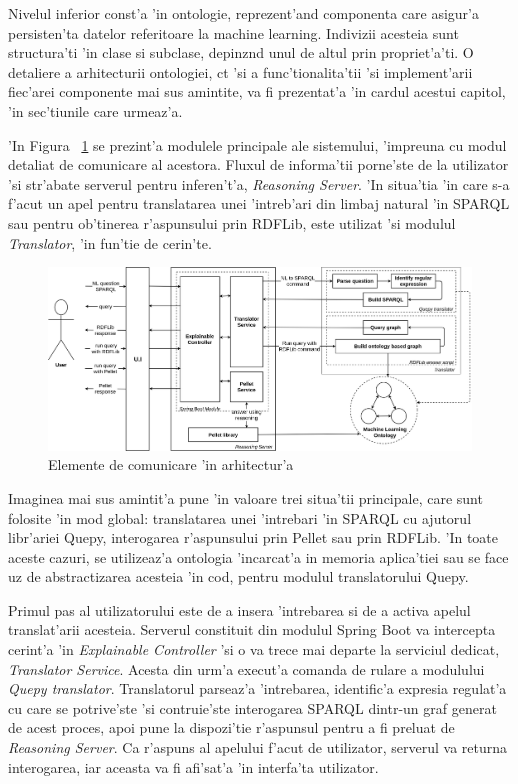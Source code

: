 \documentclass[12pt,a4paper,twoside]{report}
\begin{document}
Nivelul inferior const'a 'in ontologie, reprezent'and componenta care asigur'a persisten'ta datelor referitoare la machine learning. Indivizii acesteia sunt structura'ti 'in clase si subclase, depinz\ia nd unul de altul prin propriet'a'ti. O detaliere a arhitecturii ontologiei, c\ia t 'si a func'tionalita'tii 'si implement'arii fiec'arei componente mai sus amintite, va fi prezentat'a 'in cardul acestui capitol, 'in sec'tiunile care urmeaz'a. 

'In Figura ~\ref{fig:arch_det} se prezint'a modulele principale ale sistemului, 'impreuna cu modul detaliat de comunicare al acestora. Fluxul de informa'tii porne'ste de la utilizator 'si str'abate serverul pentru inferen't'a, {\it Reasoning Server}. 'In situa'tia 'in care s-a f'acut un apel pentru translatarea unei 'intreb'ari din limbaj natural 'in SPARQL sau pentru ob'tinerea r'aspunsului prin RDFLib, este utilizat 'si modulul {\it Translator}, 'in fun'tie de cerin'te. 

\begin{figure}
    \centering
    \includegraphics[width = 0.9\linewidth]{img/architecture_details.png}
        \caption{Elemente de comunicare 'in arhitectur'a}
    \label{fig:arch_det}
\end{figure}

Imaginea mai sus amintit'a pune 'in valoare trei situa'tii principale, care sunt folosite 'in mod global: translatarea unei 'intrebari 'in SPARQL cu ajutorul libr'ariei Quepy, interogarea r'aspunsului prin Pellet sau prin RDFLib. 'In toate aceste cazuri, se utilizeaz'a ontologia 'incarcat'a in memoria aplica'tiei sau se face uz de abstractizarea acesteia 'in cod, pentru modulul translatorului Quepy.

Primul pas al utilizatorului este de a insera 'intrebarea si de a activa apelul translat'arii acesteia. Serverul constituit din modulul Spring Boot va intercepta cerint'a 'in {\it Explainable Controller} 'si o va trece mai departe la serviciul dedicat, {\it Translator Service}. Acesta din urm'a execut'a comanda de rulare a modulului {\it Quepy translator}. Translatorul parseaz'a 'intrebarea, identific'a expresia regulat'a cu care se potrive'ste 'si contruie'ste interogarea SPARQL dintr-un graf generat de acest proces, apoi pune la dispozi'tie r'aspunsul pentru a fi preluat de {\it Reasoning Server}. Ca r'aspuns al apelului f'acut de utilizator, serverul va returna interogarea, iar aceasta va fi afi'sat'a 'in interfa'ta utilizator.
\end{document}
